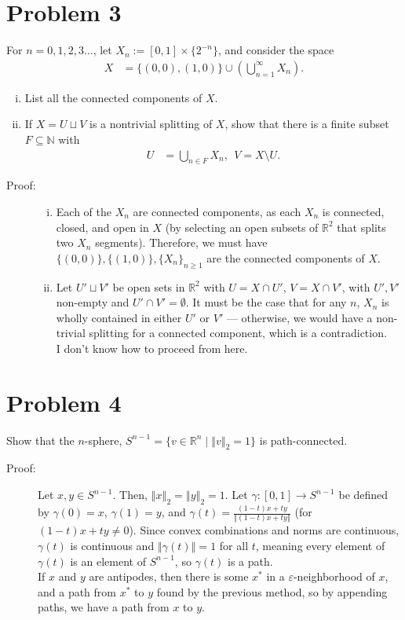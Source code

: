 \documentclass[8pt]{extarticle}
\newcommand{\N}{\mathbb{N}}
\newcommand{\R}{\mathbb{R}}
\newcommand{\norm}[1]{\left\Vert #1\right\Vert}
\begin{document}
  \section{Problem 3}%
  For $n=0,1,2,3\dots$, let $X_n := [0,1]\times \{2^{-n}\}$, and consider the space
  \begin{align*}
    X &= \{(0,0),(1,0)\} \cup \left(\bigcup_{n=1}^{\infty} X_n\right).
  \end{align*}
  \begin{enumerate}[(i)]
    \item List all the connected components of $X$.
    \item If $X = U\sqcup V$ is a nontrivial splitting of $X$, show that there is a finite subset $F\subseteq \N$ with
      \begin{align*}
        U &= \bigcup_{n\in F}X_n,~~V = X\setminus U.
      \end{align*}
  \end{enumerate}
  \begin{description}
    \item[Proof:]\hfill
      \begin{enumerate}[(i)]
        \item Each of the $X_n$ are connected components, as each $X_n$ is connected, closed, and open in $X$ (by selecting an open subsets of $\R^2$ that splits two $X_n$ segments). Therefore, we must have $\{(0,0)\},\{(1,0)\},\{X_n\}_{n\geq 1}$ are the connected components of $X$.
        \item Let $U'\sqcup V'$ be open sets in $\R^2$ with $U = X\cap U'$, $V = X\cap V'$, with $U',V'$ non-empty and $U'\cap V' = \emptyset$. It must be the case that for any $n$, $X_n$ is wholly contained in either $U'$ or $V'$ --- otherwise, we would have a non-trivial splitting for a connected component, which is a contradiction.\\

          I don't know how to proceed from here.
      \end{enumerate}
  \end{description}
  \section{Problem 4}%
  Show that the $n$-sphere, $S^{n-1} = \{v\in \R^n\mid \norm{v}_2 = 1\}$ is path-connected.
  \begin{description}
    \item[Proof:] Let $x,y\in S^{n-1}$. Then, $\norm{x}_{2} = \norm{y}_{2} = 1$. Let $\gamma: [0,1]\rightarrow S^{n-1}$ be defined by $\gamma(0) = x$, $\gamma(1) = y$, and $\gamma(t) = \frac{(1-t)x + ty}{\norm{(1-t)x + ty}}$ (for $(1-t)x + ty \neq 0$). Since convex combinations and norms are continuous, $\gamma(t)$ is continuous and $\norm{\gamma(t)} = 1$ for all $t$, meaning every element of $\gamma(t)$ is an element of $S^{n-1}$, so $\gamma(t)$ is a path.\\

      If $x$ and $y$ are antipodes, then there is some $x^{\ast}$ in a $\varepsilon$-neighborhood of $x$, and a path from $x^{\ast}$ to $y$ found by the previous method, so by appending paths, we have a path from $x$ to $y$.
  \end{description}
\end{document}
